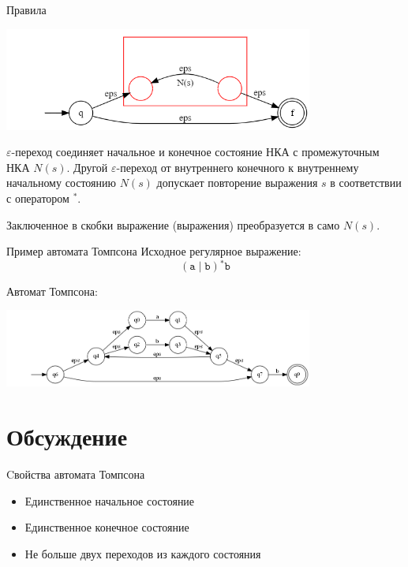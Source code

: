 \documentclass[mathserif]{beamer}
\def\alter{\ensuremath{\mathrel{\vert}}}%
\def\star{\ensuremath{^{*}}}%
\def\regexpstr#1{\mathtt{#1}}%
\newcommand{\empt}{\varepsilon} %
\begin{document}
\begin{frame}{Правила}
{        \includegraphics[width=4in, keepaspectratio]{tompson_rule5.png} %

        $\empt$-переход соединяет начальное и конечное состояние НКА с промежуточным НКА $N(s)$. Другой $\empt$-переход от внутреннего конечного к внутреннему начальному состоянию $N(s)$ допускает повторение выражения $s$ в соответствии с оператором $\star$.

        Заключенное в скобки выражение (выражения) преобразуется в само $N(s)$.
    }
\end{frame}%

\begin{frame}{Пример автомата Томпсона}
    Исходное регулярное выражение:
    \[(\regexpstr{a}\alter \regexpstr{b})\star\regexpstr{b}\] %

    Автомат Томпсона:

    \includegraphics[width=4in, keepaspectratio]{tompson2.png} %
\end{frame}

\section{Обсуждение}
\begin{frame}{Cвойства автомата Томпсона}
    \begin{itemize}
        \item Единственное начальное состояние
        \item Единственное конечное состояние
        \item Не больше двух переходов из каждого состояния
    \end{itemize}
\end{frame}
\end{document}
